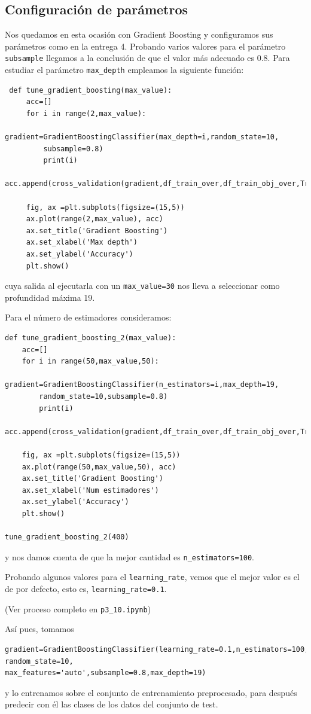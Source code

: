 \documentclass[a4paper,11pt]{article}
\begin{document}
 \subsection{Configuración de parámetros}
 Nos quedamos en esta ocasión con Gradient Boosting y configuramos sus parámetros como en la entrega 4. Probando varios valores para el parámetro \texttt{subsample} llegamos a la conclusión de que el valor más adecuado es 0.8. Para estudiar el parámetro \texttt{max_depth} empleamos la siguiente función:
 \begin{verbatim}
 def tune_gradient_boosting(max_value):
	 acc=[]
	 for i in range(2,max_value):
		 gradient=GradientBoostingClassifier(max_depth=i,random_state=10,
		 subsample=0.8)
		 print(i)
		 acc.append(cross_validation(gradient,df_train_over,df_train_obj_over,True))
	 
	 fig, ax =plt.subplots(figsize=(15,5))
	 ax.plot(range(2,max_value), acc)
	 ax.set_title('Gradient Boosting')
	 ax.set_xlabel('Max depth')
	 ax.set_ylabel('Accuracy')
	 plt.show()
 \end{verbatim}
 
 cuya salida al ejecutarla con un \texttt{max_value=30} nos lleva a seleccionar como profundidad máxima 19.
 
 Para el número de estimadores consideramos:
 \begin{verbatim}
def tune_gradient_boosting_2(max_value):
	acc=[]
	for i in range(50,max_value,50):
		gradient=GradientBoostingClassifier(n_estimators=i,max_depth=19,
		random_state=10,subsample=0.8)
		print(i)
		acc.append(cross_validation(gradient,df_train_over,df_train_obj_over,True))
		
	fig, ax =plt.subplots(figsize=(15,5))
	ax.plot(range(50,max_value,50), acc)
	ax.set_title('Gradient Boosting')
	ax.set_xlabel('Num estimadores')
	ax.set_ylabel('Accuracy')
	plt.show()
	
tune_gradient_boosting_2(400)
 \end{verbatim}
 
 y nos damos cuenta de que la mejor cantidad es \texttt{n_estimators=100}.
 
 Probando algunos valores para el \texttt{learning_rate}, vemos que el mejor valor es el de por defecto, esto es, \texttt{learning_rate=0.1}.
 
 (Ver proceso completo en \texttt{p3_10.ipynb})
 
 Así pues, tomamos
 \begin{verbatim}
gradient=GradientBoostingClassifier(learning_rate=0.1,n_estimators=100, random_state=10,
max_features='auto',subsample=0.8,max_depth=19)
 \end{verbatim}
  y lo entrenamos sobre el conjunto de entrenamiento preprocesado, para después predecir con él las clases de los datos del conjunto de test. 
 
\end{document}
